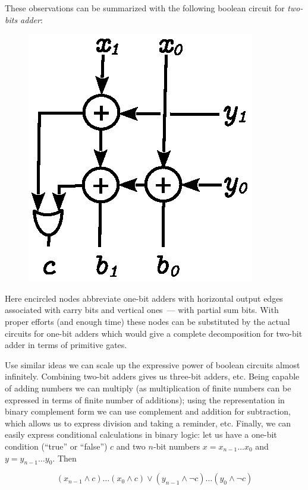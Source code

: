 These observations can be summarized with the following boolean circuit for \emph{two-bits adder}:

\begin{figure}[h]
  \centering
  \includegraphics[scale=0.7]{images/06-05.eps}
\end{figure}

Here encircled nodes abbreviate one-bit adders with horizontal output edges associated with carry bits and
vertical ones~--- with partial sum bits. With proper efforts (and enough time) these nodes can be substituted
by the actual circuits for one-bit adders which would give a complete decomposition for two-bit adder in terms of
primitive gates.

Use similar ideas we can scale up the expressive power of boolean circuits almost infinitely. Combining two-bit adders
gives us three-bit adders, etc. Being capable of adding numbers we can multiply (as multiplication of
finite numbers can be expressed in terms of finite number of additions); using the representation in binary complement
form we can use complement and addition for subtraction, which allows us to express division and taking a reminder, etc.
Finally, we can easily express conditional calculations in binary logic: let us have a one-bit condition (``true'' or ``false'') $c$ and
two $n$-bit numbers $x=x_{n-1}\dots x_0$ and $y=y_{n-1}\dots y_0$. Then

\[
(x_{n-1}\wedge c)\dots(x_0\wedge c) \vee (y_{n-1}\wedge \neg c)\dots(y_0\wedge \neg c) 
\]

